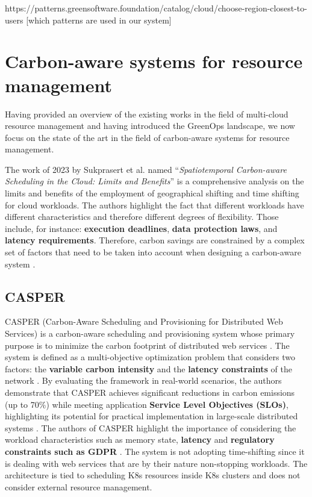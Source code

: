 https://patterns.greensoftware.foundation/catalog/cloud/choose-region-closest-to-users
[which patterns are used in our system]

\section{Carbon-aware systems for resource management}

Having provided an overview of the existing works in the field of multi-cloud resource management and having introduced the GreenOps landscape, we now focus on the state of the art in the field of carbon-aware systems for resource management.

The work of 2023 by Sukprasert et al. named ``\textit{Spatiotemporal Carbon-aware Scheduling in the Cloud: Limits and Benefits}'' \cite{10.1145/3599733.3606301} is a comprehensive analysis on the limits and benefits of the employment of geographical shifting and time shifting for cloud workloads.
The authors highlight the fact that different workloads have different characteristics and therefore different degrees of flexibility. Those include, for instance: \textbf{execution deadlines}, \textbf{data protection laws}, and \textbf{latency requirements}. Therefore, carbon savings are constrained by a complex set of factors that need to be taken into account when designing a carbon-aware system \cite{10.1145/3599733.3606301}.

\subsection{CASPER}

CASPER (Carbon-Aware Scheduling and Provisioning for Distributed Web Services) is a carbon-aware scheduling and provisioning system whose primary purpose is to minimize the carbon footprint of distributed web services \cite{Souza_2023}.
The system is defined as a multi-objective optimization problem that considers two factors: the \textbf{variable carbon intensity} and the \textbf{latency constraints} of the network \cite{Souza_2023}.
By evaluating the framework in real-world scenarios, the authors demonstrate that CASPER achieves significant reductions in carbon emissions (up to 70\%) while meeting application \textbf{Service Level Objectives (SLOs)}, highlighting its potential for practical implementation in large-scale distributed systems \cite{Souza_2023}.
The authors of CASPER highlight the importance of considering the workload characteristics such as memory state, \textbf{latency} and \textbf{regulatory constraints such as GDPR} \cite{Souza_2023}.
The system is not adopting time-shifting since it is dealing with web services that are by their nature non-stopping workloads. The architecture is tied to scheduling K8s resources inside K8s clusters and does not consider external resource management.

